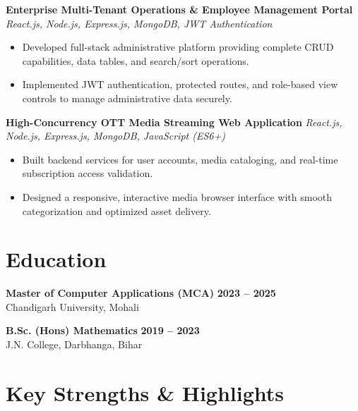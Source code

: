 \documentclass[a4paper,10pt]{article}
\begin{document}
\textbf{Enterprise Multi-Tenant Operations \& Employee Management Portal}
\hfill
\textit{React.js, Node.js, Express.js, MongoDB, JWT Authentication}

\begin{itemize}

    \item Developed full-stack administrative platform providing complete CRUD capabilities, data tables, and search/sort operations.

    \item Implemented JWT authentication, protected routes, and role-based view controls to manage administrative data securely.

\end{itemize}


\textbf{High-Concurrency OTT Media Streaming Web Application}
\hfill
\textit{React.js, Node.js, Express.js, MongoDB, JavaScript (ES6+)}

\begin{itemize}

    \item Built backend services for user accounts, media cataloging, and real-time subscription access validation.

    \item Designed a responsive, interactive media browser interface with smooth categorization and optimized asset delivery.

\end{itemize}

\section*{Education}

\textbf{Master of Computer Applications (MCA)}
\hfill
\textbf{2023 -- 2025}
\\
Chandigarh University, Mohali

\vspace{3pt}

\textbf{B.Sc. (Hons) Mathematics}
\hfill
\textbf{2019 -- 2023}
\\
J.N. College, Darbhanga, Bihar

\section*{Key Strengths \& Highlights}
\end{document}
